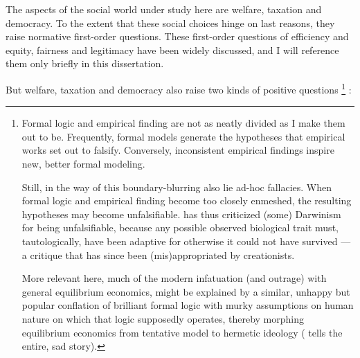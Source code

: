 The aspects of the social world under study here are welfare, taxation and democracy. 
To the extent that these social choices hinge on last reasons, they raise normative first-order questions. 
These first-order questions of efficiency and equity, fairness and legitimacy have been widely discussed, and I will reference them only briefly in this dissertation. %

But welfare, taxation and democracy also raise two kinds of positive questions
\footnote{
	Formal logic and empirical finding are not as neatly divided as I make them out to be. 
	Frequently, formal models generate the hypotheses that empirical works set out to falsify. 
	Conversely, inconsistent empirical findings inspire new, better formal modeling. 

	Still, in the way of this boundary-blurring also lie ad-hoc fallacies. 
	When formal logic and empirical finding become too closely enmeshed, the resulting hypotheses may become unfalsifiable. 
	\cite{Popper1976} has thus criticized (some) Darwinism for being unfalsifiable, because any possible observed biological trait must, tautologically, have been adaptive for otherwise it could not have survived --- a critique that has since been (mis)appropriated by creationists.
	
	More relevant here, much of the modern infatuation (and outrage) with general equilibrium economics, might be explained by a similar, unhappy but popular conflation of brilliant formal logic \citep{Walras1874,Debreu1954} with murky assumptions on human nature on which that logic supposedly operates, thereby morphing equilibrium economics from tentative model to hermetic ideology (\citealt{Cassidy2010} tells the entire, sad story).
}
:


